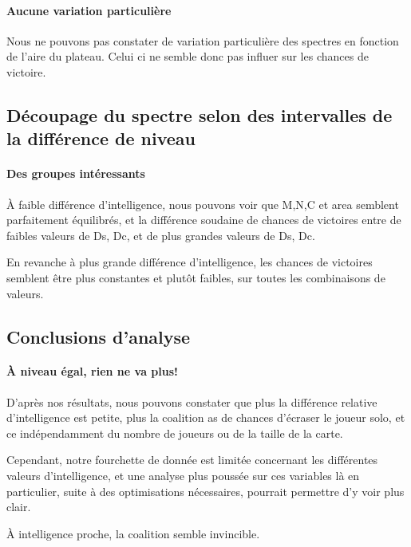 \paragraph{Aucune variation particulière}
Nous ne pouvons pas constater de variation particulière des spectres en fonction de l'aire du plateau. Celui ci ne semble donc pas influer sur les chances de victoire.

\subsection{Découpage du spectre selon des intervalles de la différence de niveau}
\paragraph{Des groupes intéressants}
À faible différence d'intelligence, nous pouvons voir que M,N,C et area semblent parfaitement équilibrés, et la différence soudaine de chances de victoires entre de faibles valeurs de Ds, Dc, et de plus grandes valeurs de Ds, Dc.

En revanche à plus grande différence d'intelligence, les chances de victoires semblent être plus constantes et plutôt faibles, sur toutes les combinaisons de valeurs. 

\subsection{Conclusions d'analyse}

\paragraph{À niveau égal, rien ne va plus!}
D'après nos résultats, nous pouvons constater que plus la différence relative d'intelligence est petite, plus la coalition as de chances d'écraser le joueur solo, et ce indépendamment du nombre de joueurs ou de la taille de la carte.

Cependant, notre fourchette de donnée est limitée concernant les différentes valeurs d'intelligence, et une analyse plus poussée sur ces variables là en particulier, suite à des optimisations nécessaires, pourrait permettre d'y voir plus clair. 

\begin{result}
	 À intelligence proche, la coalition semble invincible.
\end{result}

